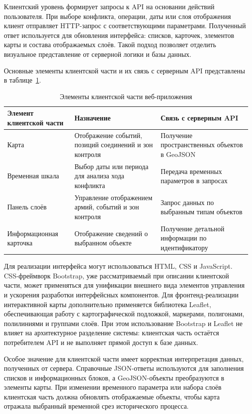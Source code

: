 Клиентский уровень формирует запросы к API на основании действий пользователя. При выборе конфликта, операции, даты или слоя отображения клиент отправляет HTTP-запрос с соответствующими параметрами. Полученный ответ используется для обновления интерфейса: списков, карточек, элементов карты и состава отображаемых слоёв. Такой подход позволяет отделить визуальное представление от серверной логики и базы данных.

Основные элементы клиентской части и их связь с серверным API представлены в таблице~\ref{tab:client-elements}.

\begin{table}[H]
\caption{Элементы клиентской части веб-приложения}
\label{tab:client-elements}
\centering
\small
\begin{tabular}{|p{3.3cm}|p{5.7cm}|p{6.0cm}|}
\hline
Элемент клиентской части & Назначение & Связь с серверным API \\
\hline
Карта & Отображение событий, позиций соединений и зон контроля & Получение пространственных объектов в GeoJSON \\
\hline
Временная шкала & Выбор даты или периода для анализа хода конфликта & Передача временных параметров в запросах \\
\hline
Панель слоёв & Управление отображением армий, событий и зон контроля & Запрос данных по выбранным типам объектов \\
\hline
Информационная карточка & Отображение сведений о выбранном объекте & Получение детальной информации по идентификатору \\
\hline
\end{tabular}
\end{table}

Для реализации интерфейса могут использоваться HTML, CSS и JavaScript. CSS-фреймворк Bootstrap, уже рассматриваемый при описании клиентской части, может применяться для унификации внешнего вида элементов управления и ускорения разработки интерфейсных компонентов. Для фронтенд-реализации интерактивной карты дополнительно применяется библиотека Leaflet, обеспечивающая работу с картографической подложкой, маркерами, полигонами, полилиниями и группами слоёв. При этом использование Bootstrap и Leaflet не влияет на архитектурное разделение системы: клиентская часть остаётся потребителем API и не выполняет прямой доступ к базе данных.

Особое значение для клиентской части имеет корректная интерпретация данных, полученных от сервера. Справочные JSON-ответы используются для заполнения списков и информационных блоков, а GeoJSON-объекты преобразуются в элементы карты. При изменении временного параметра или набора слоёв клиентская часть должна обновлять отображаемые объекты, чтобы карта отражала выбранный временной срез исторического процесса.

